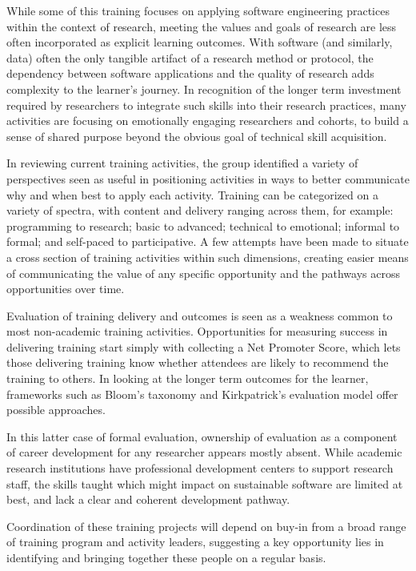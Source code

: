 While some of this training focuses on applying software engineering practices
within the context of research, meeting the values and goals of research are
less often incorporated as explicit learning outcomes. With software (and
similarly, data) often the only tangible artifact of a research method or
protocol, the dependency between software applications and the quality of
research adds complexity to the learner's journey. In recognition of the longer
term investment required by researchers to integrate such skills into their
research practices, many activities are focusing on emotionally engaging
researchers and cohorts, to build a sense of shared purpose beyond the obvious
goal of technical skill acquisition.

In reviewing current training activities, the group identified a variety of
perspectives seen as useful in positioning activities in ways to better
communicate why and when best to apply each activity. Training can be
categorized on a variety of spectra, with content and delivery ranging across them, for example:
programming to research; basic to advanced; technical to emotional; informal to
formal; and self-paced to participative. A few attempts have been made to situate a
cross section of training activities within such dimensions, creating easier
means of communicating the value of any specific opportunity and the pathways
across opportunities over time.

Evaluation of training delivery and outcomes is seen as a weakness common to
most non-academic training activities. Opportunities for measuring success in
delivering training start simply with collecting a Net Promoter Score, which
lets those delivering training know whether attendees are likely to recommend
the training to others. In looking at the longer term outcomes for the learner,
frameworks such as Bloom's taxonomy and Kirkpatrick's evaluation model offer possible
approaches.

In this latter case of formal evaluation, ownership of evaluation as a component
of career development for any researcher appears mostly absent. While academic
research institutions have professional development centers to support research
staff, the skills taught which might impact on sustainable software are limited
at best, and lack a clear and coherent development pathway.

Coordination of these training projects will depend on buy-in from a broad range
of training program and activity leaders, suggesting a key opportunity lies in
identifying and bringing together these people on a regular basis.

